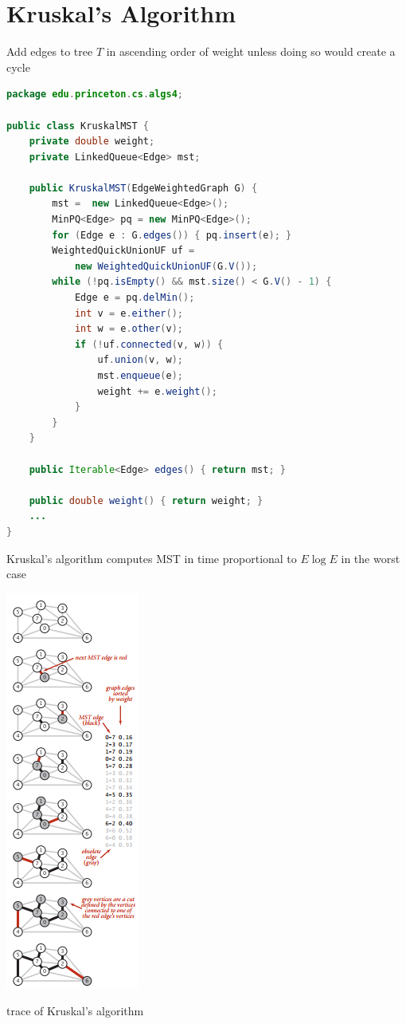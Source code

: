 \documentclass[8pt,a4paper,compress]{beamer}
\begin{document}
\section{Kruskal's Algorithm}
\begin{frame}[fragile]
\begin{minipage}{240pt}
Add edges to tree $T$ in ascending order of weight unless doing so would create a cycle
\begin{lstlisting}[language=Java]
package edu.princeton.cs.algs4;

public class KruskalMST {
    private double weight;  
    private LinkedQueue<Edge> mst;
    
    public KruskalMST(EdgeWeightedGraph G) {
        mst =  new LinkedQueue<Edge>();  
        MinPQ<Edge> pq = new MinPQ<Edge>();
        for (Edge e : G.edges()) { pq.insert(e); }
        WeightedQuickUnionUF uf = 
            new WeightedQuickUnionUF(G.V());
        while (!pq.isEmpty() && mst.size() < G.V() - 1) {
            Edge e = pq.delMin();
            int v = e.either();
            int w = e.other(v);
            if (!uf.connected(v, w)) { 
                uf.union(v, w); 
                mst.enqueue(e); 
                weight += e.weight();
            }
        }
    }

    public Iterable<Edge> edges() { return mst; }

    public double weight() { return weight; }
    ...
}
\end{lstlisting}

Kruskal's algorithm computes MST in time proportional to
$E \log E$ in the worst case
\end{minipage}%
\begin{minipage}{100pt}
\begin{center}
\includegraphics[scale=0.4]{./figures/mst4.png}

\smallskip

\tiny trace of Kruskal's algorithm
\end{center}
\end{minipage}
\end{frame}
\end{document}
